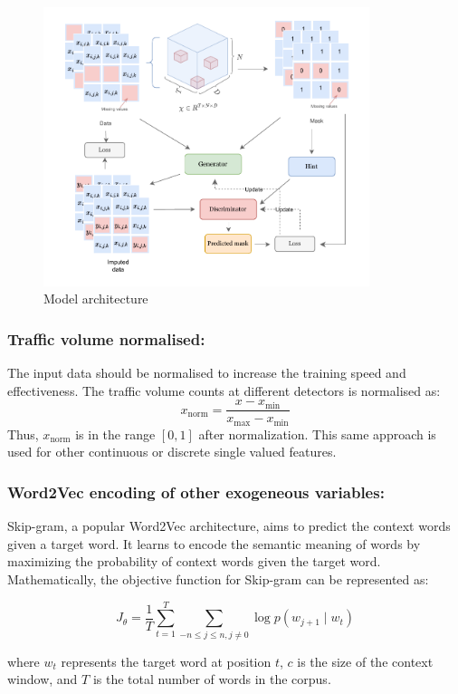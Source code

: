 \begin{figure}[htbp]
  \centering
  \includegraphics[width=0.85\textwidth]{model.pdf}
  \caption{Model architecture}
  \label{fig:dataset}
\end{figure}

\subsubsection{Traffic volume normalised:}
The input data should be normalised to increase the training speed and effectiveness. The traffic volume counts at different detectors is normalised as:
\[
x_{\text{norm}} = \frac{x - x_{\text{min}}}{x_{\text{max}} - x_{\text{min}}}
\]
Thus, \( x_{\text{norm}} \) is in the range \([0,1]\) after normalization. This same approach is used for other continuous or discrete single valued features.

\subsubsection{Word2Vec encoding of other exogeneous variables:}
Skip-gram\cite{skipgram}, a popular Word2Vec\cite{word2vec} architecture, aims to predict the context words given a target word. It learns to encode the semantic meaning of words by maximizing the probability of context words given the target word. Mathematically, the objective function for Skip-gram can be represented as:

\[
J_\theta = \frac{1}{T}\sum^{T}_{t=1}\sum_{-n\leq j \leq n, j \neq 0}\log p\left(w_{j+1} \mid w_{t}\right)
\]

where \( w_t \) represents the target word at position \( t \), \( c \) is the size of the context window, and \( T \) is the total number of words in the corpus.

